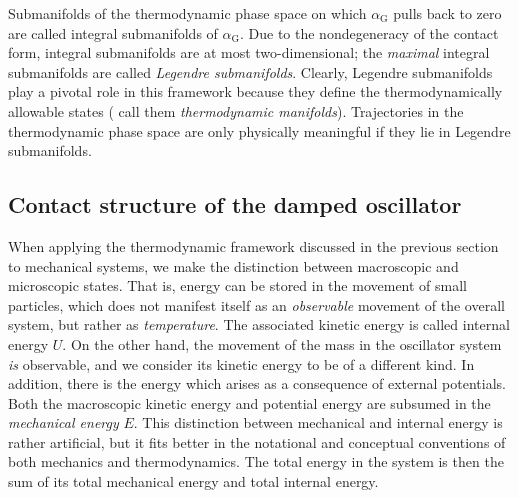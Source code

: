 Submanifolds of the thermodynamic phase space on which $\alpha_\text{G}$ pulls back to zero are called integral submanifolds of $\alpha_\text{G}$. Due to the nondegeneracy of the contact form, integral submanifolds are at most two-dimensional; the \emph{maximal} integral submanifolds are called \emph{Legendre submanifolds}. Clearly, Legendre submanifolds play a pivotal role in this framework because they define the thermodynamically allowable states (\citet{Balian2001} call them \emph{thermodynamic manifolds}). Trajectories in the thermodynamic phase space are only physically meaningful if they lie in Legendre submanifolds.

\subsection{Contact structure of the damped oscillator}
\label{ssec:thermo_dho}

When applying the thermodynamic framework discussed in the previous section to mechanical systems, we make the distinction between macroscopic and microscopic states. That is, energy can be stored in the movement of small particles, which does not manifest itself as an \emph{observable} movement of the overall system, but rather as \emph{temperature}. The associated kinetic energy is called internal energy $U$. On the other hand, the movement of the mass in the oscillator system \emph{is} observable, and we consider its kinetic energy to be of a different kind. In addition, there is the energy which arises as a consequence of external potentials. Both the macroscopic kinetic energy and potential energy are subsumed in the \emph{mechanical energy} $E$. This distinction between mechanical and internal energy is rather artificial, but it fits better in the notational and conceptual conventions of both mechanics and thermodynamics. The total energy in the system is then the sum of its total mechanical energy and total internal energy.

